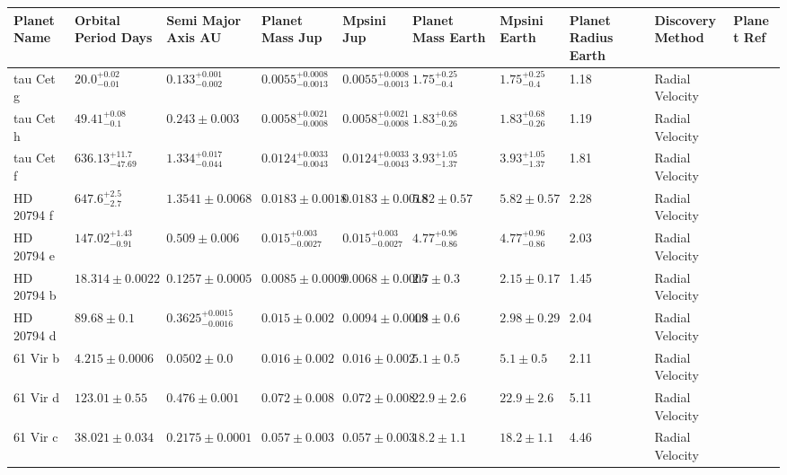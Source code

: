 \begin{tabular}{llllllllll}
\toprule
Planet Name & Orbital Period Days & Semi Major Axis AU & Planet Mass Jup & Mpsini Jup & Planet Mass Earth & Mpsini Earth & Planet Radius Earth & Discovery Method & Planet Ref \\
\midrule
tau Cet g & $20.0^{+0.02}_{-0.01}$ & $0.133^{+0.001}_{-0.002}$ & $0.0055^{+0.0008}_{-0.0013}$ & $0.0055^{+0.0008}_{-0.0013}$ & $1.75^{+0.25}_{-0.4}$ & $1.75^{+0.25}_{-0.4}$ & 1.18 & Radial Velocity & \cite{FENG_ET_AL__2017} \\
tau Cet h & $49.41^{+0.08}_{-0.1}$ & $0.243 \pm 0.003$ & $0.0058^{+0.0021}_{-0.0008}$ & $0.0058^{+0.0021}_{-0.0008}$ & $1.83^{+0.68}_{-0.26}$ & $1.83^{+0.68}_{-0.26}$ & 1.19 & Radial Velocity & \cite{FENG_ET_AL__2017} \\
tau Cet f & $636.13^{+11.7}_{-47.69}$ & $1.334^{+0.017}_{-0.044}$ & $0.0124^{+0.0033}_{-0.0043}$ & $0.0124^{+0.0033}_{-0.0043}$ & $3.93^{+1.05}_{-1.37}$ & $3.93^{+1.05}_{-1.37}$ & 1.81 & Radial Velocity & \cite{FENG_ET_AL__2017} \\
HD 20794 f & $647.6^{+2.5}_{-2.7}$ & $1.3541 \pm 0.0068$ & $0.0183 \pm 0.0018$ & $0.0183 \pm 0.0018$ & $5.82 \pm 0.57$ & $5.82 \pm 0.57$ & 2.28 & Radial Velocity & \cite{NARI_ET_AL_2025} \\
HD 20794 e & $147.02^{+1.43}_{-0.91}$ & $0.509 \pm 0.006$ & $0.015^{+0.003}_{-0.0027}$ & $0.015^{+0.003}_{-0.0027}$ & $4.77^{+0.96}_{-0.86}$ & $4.77^{+0.96}_{-0.86}$ & 2.03 & Radial Velocity & \cite{FENG_ET_AL__2017} \\
HD 20794 b & $18.314 \pm 0.0022$ & $0.1257 \pm 0.0005$ & $0.0085 \pm 0.0009$ & $0.0068 \pm 0.0005$ & $2.7 \pm 0.3$ & $2.15 \pm 0.17$ & 1.45 & Radial Velocity & \cite{NARI_ET_AL_2025} \\
HD 20794 d & $89.68 \pm 0.1$ & $0.3625^{+0.0015}_{-0.0016}$ & $0.015 \pm 0.002$ & $0.0094 \pm 0.0009$ & $4.8 \pm 0.6$ & $2.98 \pm 0.29$ & 2.04 & Radial Velocity & \cite{NARI_ET_AL_2025} \\
61 Vir b & $4.215 \pm 0.0006$ & $0.0502 \pm 0.0$ & $0.016 \pm 0.002$ & $0.016 \pm 0.002$ & $5.1 \pm 0.5$ & $5.1 \pm 0.5$ & 2.11 & Radial Velocity & \cite{VOGT_ET_AL__2010} \\
61 Vir d & $123.01 \pm 0.55$ & $0.476 \pm 0.001$ & $0.072 \pm 0.008$ & $0.072 \pm 0.008$ & $22.9 \pm 2.6$ & $22.9 \pm 2.6$ & 5.11 & Radial Velocity & \cite{VOGT_ET_AL__2010} \\
61 Vir c & $38.021 \pm 0.034$ & $0.2175 \pm 0.0001$ & $0.057 \pm 0.003$ & $0.057 \pm 0.003$ & $18.2 \pm 1.1$ & $18.2 \pm 1.1$ & 4.46 & Radial Velocity & \cite{VOGT_ET_AL__2010} \\

\end{tabular}

